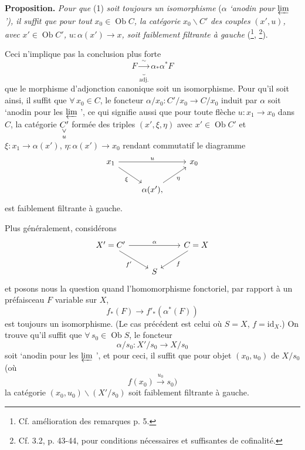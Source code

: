 \textbf{Proposition.} \textit{Pour que} (1) \textit{soit toujours un isomorphisme} ($\alpha$ \textit{`anodin pour} $\varprojlim$ \textit{'), il suffit que pour tout} $x_0 \in \operatorname{Ob} C$\textit{, la catégorie} $x_0\backslash C'$ \textit{des couples} $(x', u)$\textit{, avec} $x' \in \operatorname{Ob} C'$\textit{,} $u : \alpha(x') \longrightarrow x$\textit{, soit faiblement filtrante à gauche} (\footnote{Cf. amélioration des remarques p. 5.}, \footnote{Cf. 3.2, p. 43-44, pour conditions nécessaires et suffisantes de cofinalité.}). %

Ceci n'implique pas la conclusion plus forte
\[ F \underbrace{\xrightarrow{\;\sim\;}}_{\text{adj.}} \alpha_*\alpha^* F \]
que le morphisme d'adjonction canonique soit un isomorphisme. Pour qu'il soit ainsi, il suffit que $\forall\, x_0 \in C$, le foncteur $\alpha/x_0 : C'/x_0 \longrightarrow C/x_0$ induit par $\alpha$ soit `anodin pour les $\varprojlim$ ', ce qui signifie aussi que pour toute flèche $u : x_1 \longrightarrow x_0$ dans $C$, la catégorie $\Vcat{C'}{u}$ formée des triples $(x', \xi, \eta)$ avec $x' \in \operatorname{Ob} C'$ et $\xi : x_1 \longrightarrow \alpha(x')$, $\eta : \alpha(x') \longrightarrow x_0$ rendant commutatif
le diagramme
\[
\begin{tikzcd}
x_1 \arrow[rr, "u"] \arrow[dr, "\xi"'] & & x_0 \\
 & \alpha(x'), \arrow[ur, "\eta"'] &
\end{tikzcd}
\]
est faiblement filtrante à gauche.

Plus généralement, considérons
\[
\begin{tikzcd}
X' = C' \arrow[rr, "\alpha"] \arrow[dr, "f'"'] & & C = X \arrow[dl, "f"] \\
 & S &
\end{tikzcd}
\]
et posons nous la question quand l'homomorphisme fonctoriel, par rapport à un préfaisceau $F$ variable sur $X$,
\[ f_*(F) \longrightarrow f'_*(\alpha^*(F)) \]
est toujours un isomorphisme. (Le cas précédent est celui où $S = X$, $f = \mathrm{id}_X$.) On trouve qu'il suffit que $\forall\, s_0 \in \operatorname{Ob} S$, le foncteur
\[ \alpha/s_0 : X'/s_0 \longrightarrow X/s_0 \]
soit `anodin pour les $\varprojlim$ ', et pour ceci, il suffit que pour objet $(x_0, u_0)$ de $X/s_0$ (où
\[ f(x_0) \xrightarrow{u_0} s_0) \]
la catégorie $(x_0, u_0)\backslash(X'/s_0)$ soit faiblement filtrante à gauche.

